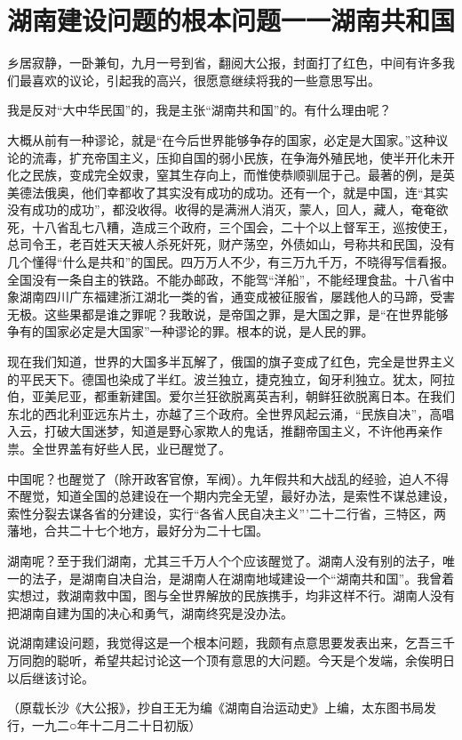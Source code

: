\section{湖南建设问题的根本问题一一湖南共和国}



乡居寂静，一卧兼旬，九月一号到省，翻阅大公报，封面打了红色，中间有许多我们最喜欢的议论，引起我的高兴，很愿意继续将我的一些意思写出。

我是反对“大中华民国”的，我是主张“湖南共和国”的。有什么理由呢？

大概从前有一种谬论，就是“在今后世界能够争存的国家，必定是大国家。”这种议论的流毒，扩充帝国主义，压抑自国的弱小民族，在争海外殖民地，使半开化未开化之民族，变成完全奴隶，窒其生存向上，而惟使恭顺驯屈于己。最著的例，是英美德法俄奥，他们幸都收了其实没有成功的成功。还有一个，就是中国，连“其实没有成功的成功”，都没收得。收得的是满洲人消灭，蒙人，回人，藏人，奄奄欲死，十八省乱七八糟，造成三个政府，三个国会，二十个以上督军王，巡按使王，总司令王，老百姓天天被人杀死奸死，财产荡空，外债如山，号称共和民国，没有几个懂得“什么是共和”的国民。四万万人不少，有三万九千万，不晓得写信看报。全国没有一条自主的铁路。不能办邮政，不能驾“洋船”，不能经理食盐。十八省中象湖南四川广东福建浙江湖北一类的省，通变成被征服省，屡践他人的马蹄，受害无极。这些果都是谁之罪呢？我敢说，是帝国之罪，是大国之罪，是“在世界能够争有的国家必定是大国家”一种谬论的罪。根本的说，是人民的罪。

现在我们知道，世界的大国多半瓦解了，俄国的旗子变成了红色，完全是世界主义的平民天下。德国也染成了半红。波兰独立，捷克独立，匈牙利独立。犹太，阿拉伯，亚美尼亚，都重新建国。爱尔兰狂欲脱离英吉利，朝鲜狂欲脱离日本。在我们东北的西北利亚远东片土，亦越了三个政府。全世界风起云涌，“民族自决”，高唱入云，打破大国迷梦，知道是野心家欺人的鬼话，推翻帝国主义，不许他再亲作祟。全世界盖有好些人民，业已醒觉了。

中国呢？也醒觉了（除开政客官僚，军阀）。九年假共和大战乱的经验，迫人不得不醒觉，知道全国的总建设在一个期内完全无望，最好办法，是索性不谋总建设，索性分裂去谋各省的分建设，实行“各省人民自决主义”’二十二行省，三特区，两藩地，合共二十七个地方，最好分为二十七国。

湖南呢？至于我们湖南，尤其三千万人个个应该醒觉了。湖南人没有别的法子，唯一的法子，是湖南自决自治，是湖南人在湖南地域建设一个“湖南共和国”。我曾着实想过，救湖南救中国，图与全世界解放的民族携手，均非这样不行。湖南人没有把湖南自建为国的决心和勇气，湖南终究是没办法。

说湖南建设问题，我觉得这是一个根本问题，我颇有点意思要发表出来，乞吾三千万同胞的聪听，希望共起讨论这一个顶有意思的大问题。今天是个发端，余俟明日以后继该讨论。

\begin{flushright}（原载长沙《大公报》，抄自王无为编《湖南自治运动史》上编，太东图书局发行，一九二○年十二月二十日初版）\end{flushright}

